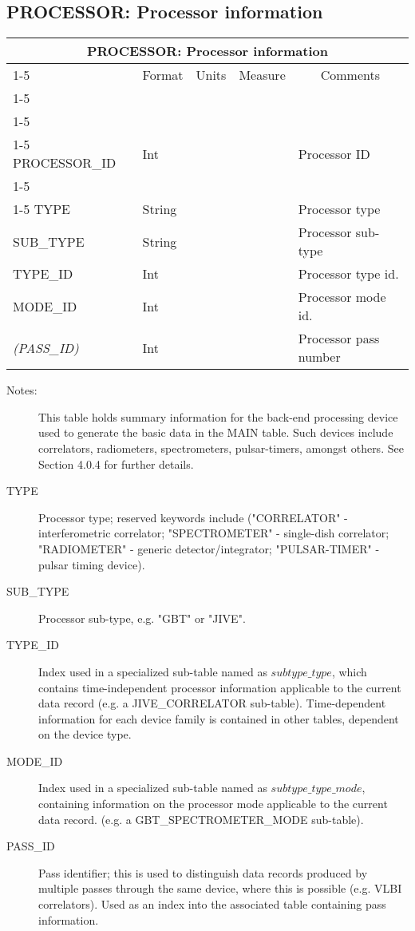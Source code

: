 \documentclass{article}
\newcommand{\defline}[1]{\cline{1-5}
\multicolumn{5}{|l|}{#1} \\
\cline{1-5}}
\newcommand{\definetable}[2]
{
	\vfill\newpage
	\subsection{#1}
        \vspace{0.15in}
        \small
	\begin{tabular}{|l|p{1.25in}|l|p{.9in}|p{1.4in}|}
	\hline
	\multicolumn{5}{|c|}{\bf #1}\\ 
	\cline{1-5}
        \multicolumn{1}{|c|}{Name}&\multicolumn{1}{|c|}{Format}&
        \multicolumn{1}{|c|}{Units}&\multicolumn{1}{|c|}{Measure}&
        \multicolumn{1}{|c|}{Comments}\\
        \cline{1-5}
        #2
        \hline
	\end{tabular}
}
\begin{document}
\definetable{PROCESSOR: Processor information}{
\defline{\bf Columns}
\defline{\em Key}
PROCESSOR\_ID & Int & & & Processor ID \\
\defline{\em Data}
TYPE            & String & & & Processor type \\
SUB\_TYPE & String & & & Processor sub-type\\
TYPE\_ID  & Int & & & Processor type id.\\
MODE\_ID  & Int & & & Processor mode id.\\
{\it (PASS\_ID)}  & Int & & & Processor pass number\\
}
\begin{description}

\item[Notes:] This table holds summary information for the back-end
processing device used to generate the basic data in the MAIN
table. Such devices include correlators, radiometers, spectrometers,
pulsar-timers, amongst others. See Section 4.0.4 for further details.

\item[TYPE] Processor type; reserved keywords include ("CORRELATOR" -
interferometric correlator; "SPECTROMETER" - single-dish correlator;
"RADIOMETER" - generic detector/integrator; "PULSAR-TIMER" - pulsar
timing device).

\item[SUB\_TYPE] Processor sub-type, e.g. "GBT" or "JIVE".

\item[TYPE\_ID] Index used in a specialized sub-table named as
$subtype\_type$, which contains time-independent processor information
applicable to the current data record (e.g. a JIVE\_CORRELATOR
sub-table).  Time-dependent information for each device family is
contained in other tables, dependent on the device type.

\item[MODE\_ID] Index used in a specialized sub-table named as
$subtype\_type\_mode$, containing information on the processor mode
applicable to the current data record. (e.g. a GBT\_SPECTROMETER\_MODE
sub-table).

\item[PASS\_ID] Pass identifier; this is used to distinguish data records
produced by multiple passes through the same device, where this is
possible (e.g. VLBI correlators). Used as an index into the associated
table containing pass information.

\end{description}
\end{document}
